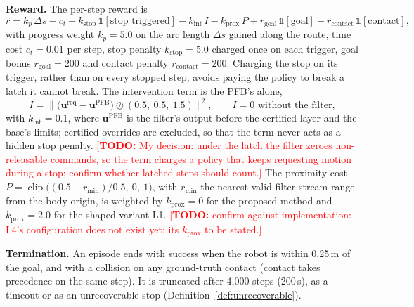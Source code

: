 \documentclass[sensors,article,submit,moreauthors]{Definitions/mdpi}
\newcommand{\todo}[1]{\textcolor{red}{[\textbf{TODO:} #1]}}
\begin{document}
\textbf{Reward.} The per-step reward is
\begin{equation}
r = k_p\,\Delta s - c_t - k_{\text{stop}}\,\mathbb{1}[\text{stop triggered}] - k_{\text{int}}\,I - k_{\text{prox}}\,P + r_{\text{goal}}\,\mathbb{1}[\text{goal}] - r_{\text{contact}}\,\mathbb{1}[\text{contact}],
\label{eq:reward}
\end{equation}
with progress weight $k_p = 5.0$ on the arc length $\Delta s$ gained along the route, time cost $c_t = 0.01$ per step, stop penalty $k_{\text{stop}} = 5.0$ charged once on each trigger, goal bonus $r_{\text{goal}} = 200$ and contact penalty $r_{\text{contact}} = 200$. Charging the stop on its trigger, rather than on every stopped step, avoids paying the policy to break a latch it cannot break. The intervention term is the PFB's alone,
\begin{equation}
I = \Big\|\big(\mathbf{u}^{\text{req}} - \mathbf{u}^{\text{PFB}}\big) \oslash (0.5,\ 0.5,\ 1.5)\Big\|^2,\qquad I = 0 \text{ without the filter},
\label{eq:intervention}
\end{equation}
with $k_{\text{int}} = 0.1$, where $\mathbf{u}^{\text{PFB}}$ is the filter's output before the certified layer and the base's limits; certified overrides are excluded, so that the term never acts as a hidden stop penalty. \todo{My decision: under the latch the filter zeroes non-releasable commands, so the term charges a policy that keeps requesting motion during a stop; confirm whether latched steps should count.} The proximity cost $P = \operatorname{clip}\big((0.5 - r_{\min})/0.5,\ 0,\ 1\big)$, with $r_{\min}$ the nearest valid filter-stream range from the body origin, is weighted by $k_{\text{prox}} = 0$ for the proposed method and $k_{\text{prox}} = 2.0$ for the shaped variant L1. \todo{confirm against implementation: L4's configuration does not exist yet; its $k_{\text{prox}}$ to be stated.}

\textbf{Termination.} An episode ends with success when the robot is within 0.25\,m of the goal, and with a collision on any ground-truth contact (contact takes precedence on the same step). It is truncated after 4{,}000 steps (200\,s), as a timeout or as an unrecoverable stop (Definition~\ref{def:unrecoverable}).
\end{document}
